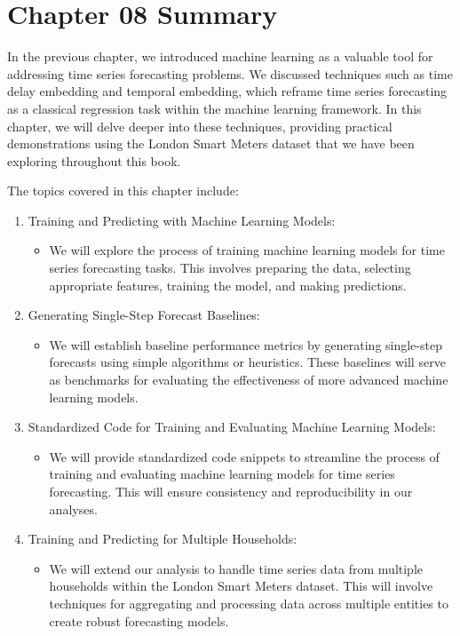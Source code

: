 \documentclass{article}
\begin{document}
\section{Chapter 08 Summary}
In the previous chapter, we introduced machine learning as a valuable tool for addressing time series forecasting problems. We discussed techniques such as time delay embedding and temporal embedding, which reframe time series forecasting as a classical regression task within the machine learning framework. In this chapter, we will delve deeper into these techniques, providing practical demonstrations using the London Smart Meters dataset that we have been exploring throughout this book.

The topics covered in this chapter include:

\begin{enumerate}
    \item Training and Predicting with Machine Learning Models:
    \begin{itemize}
        \item We will explore the process of training machine learning models for time series forecasting tasks. This involves preparing the data, selecting appropriate features, training the model, and making predictions.
    \end{itemize}
    
    \item Generating Single-Step Forecast Baselines:
    \begin{itemize}
        \item We will establish baseline performance metrics by generating single-step forecasts using simple algorithms or heuristics. These baselines will serve as benchmarks for evaluating the effectiveness of more advanced machine learning models.
    \end{itemize}
    
    \item Standardized Code for Training and Evaluating Machine Learning Models:
    \begin{itemize}
        \item We will provide standardized code snippets to streamline the process of training and evaluating machine learning models for time series forecasting. This will ensure consistency and reproducibility in our analyses.
    \end{itemize}
    
    \item Training and Predicting for Multiple Households:
    \begin{itemize}
        \item We will extend our analysis to handle time series data from multiple households within the London Smart Meters dataset. This will involve techniques for aggregating and processing data across multiple entities to create robust forecasting models.
    \end{itemize}
\end{enumerate}
\end{document}
